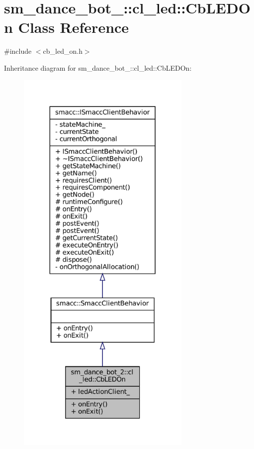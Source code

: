 \hypertarget{classsm__dance__bot__2_1_1cl__led_1_1CbLEDOn}{}\section{sm\+\_\+dance\+\_\+bot\+\_\+:\+:cl\+\_\+led\+:\+:Cb\+L\+E\+D\+On Class Reference}
\label{classsm__dance__bot__2_1_1cl__led_1_1CbLEDOn}


{\ttfamily \#include $<$cb\+\_\+led\+\_\+on.\+h$>$}



Inheritance diagram for sm\+\_\+dance\+\_\+bot\+\_\+:\+:cl\+\_\+led\+:\+:Cb\+L\+E\+D\+On\+:
\nopagebreak
\begin{figure}[H]
\begin{center}
\leavevmode
\includegraphics[height=550pt]{classsm__dance__bot__2_1_1cl__led_1_1CbLEDOn__inherit__graph}
\end{center}
\end{figure}



